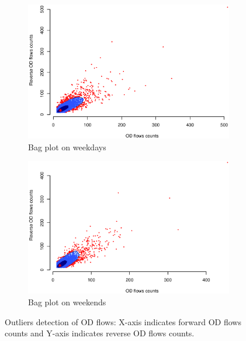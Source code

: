 \documentclass[a4paper,UKenglish]{lipics-v2018}
\begin{document}
\begin{figure}
	\centering
	\begin{subfigure}[b]{0.49\textwidth}
		\includegraphics[width=\textwidth]{images/OD_weekdays.eps}
		\caption{Bag plot on weekdays}
		\label{fig:weekdays_bag}
	\end{subfigure}
	\hfill %
	\begin{subfigure}[b]{0.49\textwidth}
		\includegraphics[width=\textwidth]{images/OD_weekends.eps}
		\caption{Bag plot on weekends}
		\label{fig:weekends_bag}
	\end{subfigure}
	\caption{Outliers detection of OD flows: X-axis indicates forward OD flows counts and Y-axis indicates reverse OD flows counts.}\label{fig:week_weekends_bag}	
\end{figure}
\end{document}
